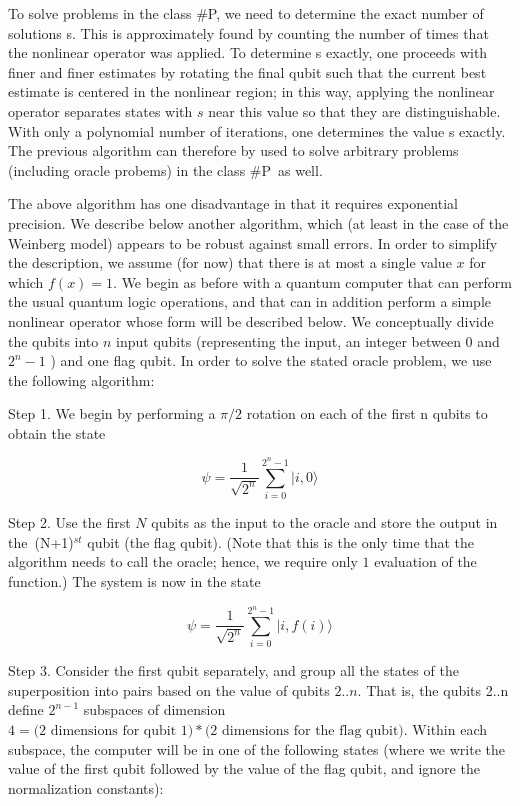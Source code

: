 \documentclass[12pt]{article}
\begin{document}
To solve problems in the class \#P, we need to determine the exact number of
solutions s. This is approximately found by counting the number of times that
the nonlinear operator was applied. To determine s exactly, one proceeds with
finer and finer estimates by rotating the final qubit such that the current
best estimate is centered in the nonlinear region; in this way, applying the
nonlinear operator separates states with $s$ near this value so that they are
distinguishable. With only a polynomial number of iterations, one determines
the value s exactly. The previous algorithm can therefore by used to solve
arbitrary problems (including oracle probems) in the class \#P\ as well.

The above algorithm has one disadvantage in that it requires exponential
precision.  We describe below another algorithm, which (at least in the case
of the Weinberg model) appears to be robust against small errors. In order to
simplify the description, we assume (for now) that there is at most a single
value $x$ for which $f(x) = 1$. We begin as before with a quantum computer that
can perform the usual quantum logic operations, and that can in addition
perform a simple nonlinear operator whose form will be described below. We
conceptually divide the qubits into $n$ input qubits (representing the input,
an integer between $0$ and $2^{n}-1$ ) and one flag qubit. In order to solve the
stated oracle problem, we use the following algorithm:

Step 1. We begin by performing a $\pi/2$ rotation on each of the first n
qubits to obtain the state%

\begin{equation}
\psi=\frac{1}{\sqrt{2^{n}}}\sum\limits_{i=0}^{2^{n}-1}|i,0\rangle
\end{equation}

Step 2. Use the first $N$ qubits as the input to the oracle and store the output
in the\ (N+1)$^{st}$ qubit (the flag qubit). (Note that this is the only time
that the algorithm needs to call the oracle; hence, we require only $1$
evaluation of the function.) The system is now in the state%

\begin{equation}
\psi=\frac{1}{\sqrt{2^{n}}}\sum\limits_{i=0}^{2^{n}-1}|i,f(i)\rangle
\end{equation}

Step 3. Consider the first qubit separately, and group all the states of the
superposition into pairs based on the value of qubits $2..n$. That is, the
qubits 2..n define $2^{n-1}$ subspaces of dimension $4 = \text{(2 dimensions for
qubit 1)} * \text{(2 dimensions for the flag qubit)}$. Within each subspace, the
computer will be in one of the following states (where we write the value of
the first qubit followed by the value of the flag qubit, and ignore the
normalization constants):%
\end{document}
